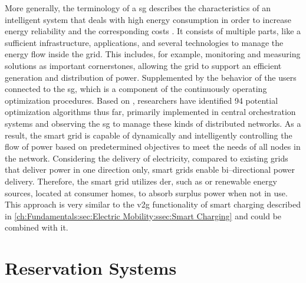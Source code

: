 More generally, the terminology of a \acrfull{sg} describes the characteristics of an intelligent system that deals with high energy consumption in order to increase energy reliability and the corresponding costs \cite{moreno_escobar_comprehensive_2021,sharma_smart_2020}.
It consists of multiple parts, like a sufficient infrastructure, applications, and several technologies to manage the energy flow inside the grid.
This includes, for example, monitoring and measuring solutions as important cornerstones, allowing the grid to support an efficient generation and distribution of power. Supplemented by the behavior of the users connected to the \acrshort{sg}, which is a component of the continuously operating optimization procedures.
Based on \cite{moreno_escobar_comprehensive_2021}, researchers have identified 94 potential optimization algorithms thus far, primarily implemented in central orchestration systems and observing the \acrshort{sg} to manage these kinds of distributed networks.
As a result, the smart grid is capable of dynamically and intelligently controlling the flow of power based on predetermined objectives to meet the needs of all nodes in the network.
Considering the delivery of electricity, compared to existing grids that deliver power in one direction only, smart grids enable bi--directional power delivery.
Therefore, the smart grid utilizes \acrshort{der}, such as  or renewable energy sources, located at consumer homes, to absorb surplus power when not in use.
This approach is very similar to the \acrshort{v2g} functionality of smart charging described in \ref{ch:Fundamentals:sec:Electric Mobility:ssec:Smart Charging} and could be combined with it.

\section{Reservation Systems}
\label{ch:Fundamentals:sec:Reservation Systems}

